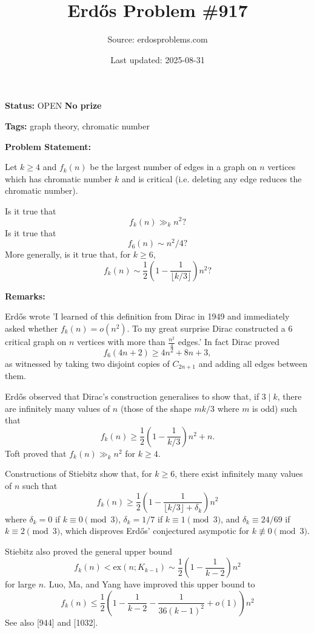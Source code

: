\documentclass{article}
\title{Erd\H{o}s Problem \#917}
\date{Last updated: 2025-08-31}
\author{Source: erdosproblems.com}
\begin{document}
\maketitle

\noindent\textbf{Status:} OPEN \quad \textbf{No prize}

\noindent\textbf{Tags:} graph theory, chromatic number

\medskip
\noindent\textbf{Problem Statement:}

Let $k\geq 4$ and $f_k(n)$ be the largest number of edges in a graph on $n$ vertices which has chromatic number $k$ and is critical (i.e. deleting any edge reduces the chromatic number).

Is it true that\[f_k(n) \gg_k n^2?\]Is it true that\[f_6(n)\sim n^2/4?\]More generally, is it true that, for $k\geq 6$,\[f_k(n) \sim \frac{1}{2}\left(1-\frac{1}{\lfloor k/3\rfloor}\right)n^2?\]

\bigskip
\noindent\textbf{Remarks:}

Erd\H{o}s \cite{Er93} wrote 'I learned of this definition from Dirac in 1949 and immediately asked whether $f_k(n)=o(n^2)$. To my great surprise Dirac constructed a $6$ critical graph on $n$ vertices with more than $\frac{n^2}{4}$ edges.' In fact Dirac \cite{Di52} proved\[f_6(4n+2) \geq 4n^2+8n+3,\]as witnessed by taking two disjoint copies of $C_{2n+1}$ and adding all edges between them.

Erd\H{o}s \cite{Er69b} observed that Dirac's construction generalises to show that, if $3\mid k$, there are infinitely many values of $n$ (those of the shape $mk/3$ where $m$ is odd) such that\[f_k(n) \geq \frac{1}{2}\left(1-\frac{1}{k/3}\right)n^2 + n.\]Toft \cite{To70} proved that $f_k(n)\gg_k n^2$ for $k\geq 4$.

Constructions of Stiebitz \cite{St87} show that, for $k\geq 6$, there exist infinitely many values of $n$ such that\[f_k(n) \geq \frac{1}{2}\left(1-\frac{1}{\lfloor k/3\rfloor+\delta_k}\right)n^2\]where $\delta_k=0$ if $k\equiv 0\pmod{3}$, $\delta_k=1/7$ if $k\equiv 1\pmod{3}$, and $\delta_k\equiv 24/69$ if $k\equiv 2\pmod{3}$, which disproves Erd\H{o}s' conjectured asympotic for $k\not\equiv 0\pmod{3}$.

Stiebitz also proved the general upper bound\[f_k(n) < \mathrm{ex}(n;K_{k-1})\sim \frac{1}{2}\left(1-\frac{1}{k-2}\right)n^2\]for large $n$. Luo, Ma, and Yang \cite{LMY23} have improved this upper bound to\[f_k(n) \leq \frac{1}{2}\left(1-\frac{1}{k-2}-\frac{1}{36(k-1)^2}+o(1)\right)n^2\]See also [944] and [1032].
\end{document}
